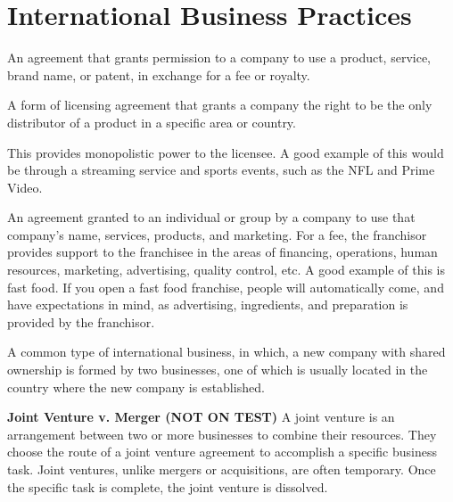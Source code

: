 \section{International Business Practices}

\begin{definition}
    An agreement that grants permission to a company to use a product, service,
    brand name, or patent, in exchange for a fee or royalty.
\end{definition}

\begin{definition}
    A form of licensing agreement that grants a company the right
    to be the only distributor of a product in a specific area or country.
\end{definition}

This provides monopolistic power to the licensee. 
A good example of this would be through a streaming service 
and sports events, such as the NFL and Prime Video. \\

\begin{definition}[Franchise]
    An agreement granted to an individual or group by a company to use that 
    company's name, services, products, and marketing.
    For a fee, the franchisor provides support to the franchisee in the areas of 
    financing, operations, human resources, marketing, advertising, quality control, etc.
    A good example of this is fast food. If you open a fast food franchise, people will automatically
    come, and have expectations in mind, as advertising, ingredients, and preparation is provided by
    the franchisor.
\end{definition}

\begin{definition}
    A common type of international business, in which, a new company with shared ownership is formed 
    by two businesses, one of which is usually located in the country where the new company is established.
\end{definition}

\textbf{Joint Venture v. Merger (NOT ON TEST)}
A joint venture is an arrangement between two or more businesses to combine their resources. 
They choose the route of a joint venture agreement to accomplish a specific business task. 
Joint ventures, unlike mergers or acquisitions, are often temporary. Once the specific task is 
complete, the joint venture is dissolved.

